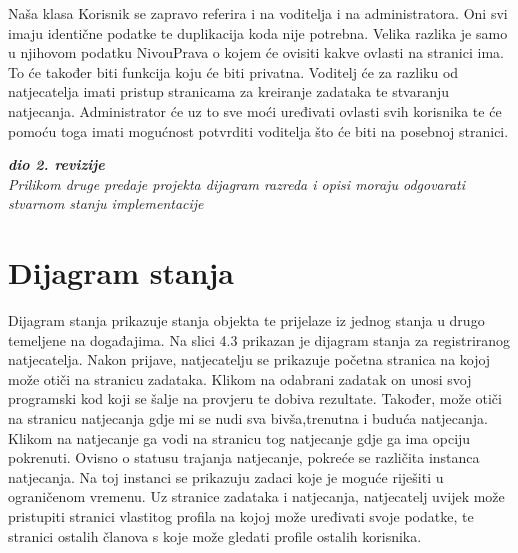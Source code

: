 			Naša klasa Korisnik se zapravo referira i na voditelja i na administratora. Oni svi imaju identične podatke te duplikacija koda
			nije potrebna. Velika razlika je samo u njihovom podatku NivouPrava o kojem će ovisiti kakve ovlasti na stranici ima.
			To će također biti funkcija koju će biti privatna. Voditelj će za razliku od natjecatelja imati pristup stranicama
			za  kreiranje zadataka te stvaranju natjecanja. Administrator će uz to sve moći uređivati ovlasti svih korisnika te će pomoću toga imati mogućnost potvrditi voditelja što će biti na posebnoj stranici.



				\eject
			
			\textbf{\textit{dio 2. revizije}}\\			
			
			\textit{Prilikom druge predaje projekta dijagram razreda i opisi moraju odgovarati stvarnom stanju implementacije}
			
			
			
			\eject
		
		\section{Dijagram stanja}
			
		
			Dijagram stanja prikazuje stanja objekta te prijelaze iz jednog stanja u drugo temeljene na događajima. Na slici 4.3 prikazan je dijagram stanja za registriranog natjecatelja. Nakon prijave, natjecatelju se prikazuje početna stranica na kojoj može otiči na stranicu zadataka. Klikom na odabrani zadatak on unosi svoj programski kod koji se šalje na provjeru te dobiva rezultate. Također, može otiči na stranicu natjecanja gdje mi se nudi sva bivša,trenutna i buduća natjecanja. Klikom na natjecanje ga vodi na stranicu tog natjecanje gdje ga ima opciju pokrenuti. Ovisno o statusu trajanja natjecanje, pokreće se različita instanca natjecanja. Na toj instanci se prikazuju zadaci koje je moguće riješiti u ograničenom vremenu. Uz stranice zadataka i natjecanja, natjecatelj uvijek može pristupiti stranici vlastitog profila na kojoj može uređivati svoje podatke, te stranici ostalih članova s koje može gledati profile ostalih korisnika. 
			

